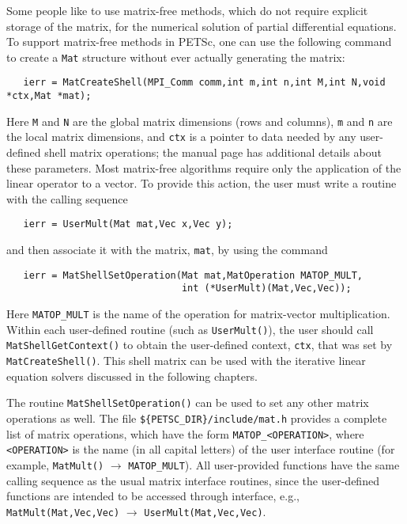 \label{sec:matrixfree}
Some people like to use matrix-free methods, which do not require
explicit storage of the matrix, for the numerical solution of partial
differential equations.  To support matrix-free methods in PETSc, one
can use the following command to create a {\tt Mat} structure without
ever actually generating the matrix:
\begin{verbatim}
   ierr = MatCreateShell(MPI_Comm comm,int m,int n,int M,int N,void *ctx,Mat *mat);
\end{verbatim}
Here {\tt M} and {\tt N} are the global matrix dimensions (rows and
columns), {\tt m} and {\tt n} are the local matrix dimensions, and
{\tt ctx} is a pointer to data needed by any user-defined shell matrix
operations; the manual page has additional details about these
parameters.  Most matrix-free algorithms require only the application
of the linear operator to a vector. To provide this action, the user
must write a routine with the calling sequence
\begin{verbatim}
   ierr = UserMult(Mat mat,Vec x,Vec y);
\end{verbatim}
and then associate it with the matrix, {\tt mat}, by using the 
command 
\begin{verbatim}
   ierr = MatShellSetOperation(Mat mat,MatOperation MATOP_MULT,
                               int (*UserMult)(Mat,Vec,Vec));
\end{verbatim}
Here {\tt MATOP\_MULT} is the name of the operation for matrix-vector
multiplication. Within each user-defined routine (such as
{\tt UserMult()}), the user should call 
{\tt MatShellGetContext()} to obtain the user-defined context, {\tt ctx},
that was set by {\tt MatCreateShell()}.
This shell matrix can be used with the iterative linear
equation solvers discussed in the following chapters.

The routine {\tt MatShellSetOperation()} can be used to set any other
matrix operations as well.  The file 
{\tt \$\{PETSC\_DIR\}/include/mat.h} provides a complete list of matrix
operations, which have the form {\tt MATOP\_<OPERATION>}, where {\tt
<OPERATION>} is the name (in all capital letters) of the user
interface routine (for example, {\tt MatMult()} $ \rightarrow $ {\tt MATOP\_MULT}).  All
user-provided functions have the same calling sequence as the
usual matrix interface routines, since the user-defined functions are
intended to be accessed through interface, e.g., 
{\tt MatMult(Mat,Vec,Vec)} $ \rightarrow$ {\tt UserMult(Mat,Vec,Vec)}.

